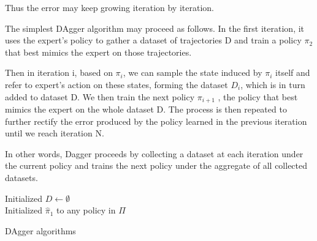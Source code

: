 \documentclass[twoside]{article}
\begin{document}
Thus the error may keep growing iteration by iteration.

The simplest DAgger algorithm may proceed as follows.
In the first iteration, it uses the expert’s policy to gather
a dataset of trajectories D and train a policy $\pi_2$ that best
mimics the expert on those trajectories. 

Then in iteration i, based on $\pi_i$, we can sample the state induced by $\pi_i$ itself and refer to expert's action on these states, forming the dataset $D_i$, which is in turn added to dataset D. We then train the next policy $\pi_{i+1}$ , the policy that best mimics the expert on the whole dataset D. The process is then repeated to further rectify the error produced by the policy learned in the previous iteration until we reach iteration N.

In other words, Dagger proceeds by collecting a dataset
at each iteration under the current policy and trains the next policy under the aggregate of all collected datasets. 






\begin{algorithm}[htb]
 \KwData{}
 Initialized $D \leftarrow \emptyset$ \\
 Initialized $\hat{\pi}_1$ to any policy in $\Pi$ \\
 \caption{DAgger algorithms}
\end{algorithm}


\end{document}
